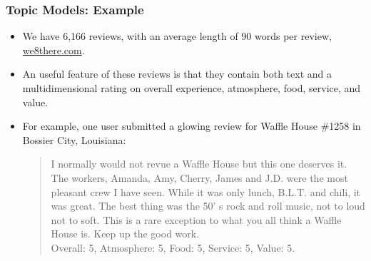 \documentclass[
  shownotes,
  xcolor={svgnames},
  hyperref={colorlinks,citecolor=DarkBlue,linkcolor=DarkRed,urlcolor=DarkBlue}
  , aspectratio=169]{beamer}
\begin{document}
\begin{frame}
\frametitle{Topic Models: Example}

\begin{itemize}


\item We have 6,166 reviews, with an average length of 90 words per review, \url{we8there.com}. 
\medskip
\item An useful feature of these reviews is that they contain both text and a multidimensional rating on overall experience, atmosphere, food, service, and value. 
\medskip
\item For example, one user submitted a glowing review for Waffle House \#1258 in Bossier City, Louisiana: 
\medskip

\begin{quote}
I normally would not revue a Waffle House but this one deserves it. The workers, Amanda, Amy, Cherry, James and J.D. were the most pleasant crew I have seen. While it was only lunch, B.L.T. and chili, it was great. The best thing was the 50’ s rock and roll music, not to loud not to soft. This is a rare exception to what you all think a Waffle House is. Keep up the good work. \\
Overall: 5, Atmosphere: 5, Food: 5, Service: 5, Value: 5.  
 \end{quote} 


\end{itemize}
\end{frame}
\end{document}

